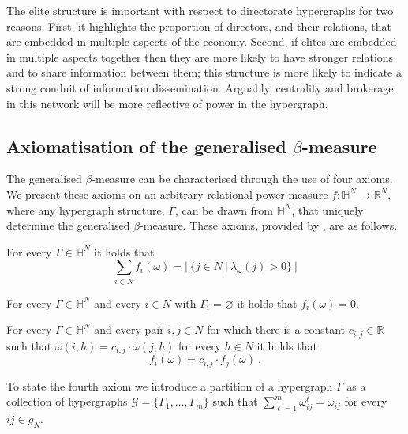 The elite structure is important with respect to directorate hypergraphs for two reasons. First, it highlights the proportion of directors, and their relations, that are embedded in multiple aspects of the economy. Second, if elites are embedded in multiple aspects together then they are more likely to have stronger relations and to share information between them; this structure is more likely to indicate a strong conduit of information dissemination. Arguably, centrality and brokerage in this network will be more reflective of power in the hypergraph.

\begin{subappendices}
\section{Axiomatisation of the generalised $\beta$-measure}
\label{BetaAxiomatisation}

The generalised $\beta$-measure can be characterised through the use of four axioms. We present these axioms on an arbitrary relational power measure $f : \mathbb{H}^{N} \rightarrow \mathbb{R}^{N}$, where any hypergraph structure, $\Gamma$, can be drawn from $\mathbb{H}^{N}$, that uniquely determine the generalised $\beta$-measure. These axioms, provided by \cite{BrinkGilles2000}, are as follows.

\begin{axiom} \label{ax:1}
For every $\Gamma \in \mathbb{H}^{N}$ it holds that
\[
\sum_{i \in N} f_{i}(\omega) = | ~ \{ j \in N ~ | ~ \lambda_{\omega}(j) > 0 \} ~ |
\]
\end{axiom}

\begin{axiom} \label{ax:2}
For every $\Gamma \in \mathbb{H}^{N}$ and every $i \in N$ with $\Gamma_{i} = \varnothing$ it holds that $f_{i}(\omega) = 0$.
\end{axiom}

\begin{axiom} \label{ax:3}
For every $\Gamma \in \mathbb{H}^{N}$ and every pair $i,j \in N$ for which there is a constant $c_{i,j} \in \mathbb{R}$ such that $\omega(i,h) = c_{i,j} \cdot \omega(j,h)$ for every $h \in N$ it holds that
\begin{equation}
f_{i}(\omega) = c_{i,j} \cdot f_{j}(\omega) ~ .
\end{equation}
\end{axiom}

To state the fourth axiom we introduce a partition of a hypergraph $\Gamma$ as a collection of hypergraphs $\mathcal{G} = \{\Gamma_{1}, \ldots, \Gamma_{m}\}$ such that $\sum_{\ell = 1}^{m} \omega_{ij}^{\ell} = \omega_{ij}$ for every $ij \in g_{N}$.



\end{subappendices}
